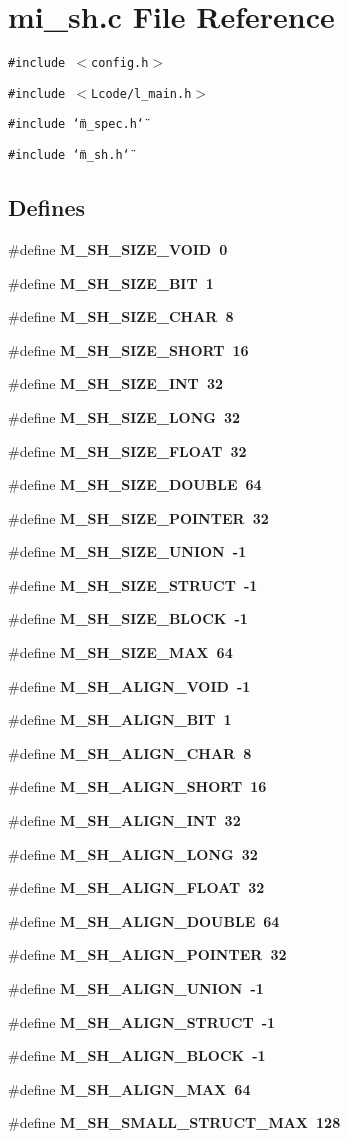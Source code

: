 \section{mi\_\-sh.c File Reference}
\label{mi__sh_8c}
{\tt \#include $<$config.h$>$}\par
{\tt \#include $<$Lcode/l\_\-main.h$>$}\par
{\tt \#include \char`\"{}m\_\-spec.h\char`\"{}}\par
{\tt \#include \char`\"{}m\_\-sh.h\char`\"{}}\par
\subsection*{Defines}
\begin{CompactItemize}
\item 
\#define \bf{M\_\-SH\_\-SIZE\_\-VOID}~0
\item 
\#define \bf{M\_\-SH\_\-SIZE\_\-BIT}~1
\item 
\#define \bf{M\_\-SH\_\-SIZE\_\-CHAR}~8
\item 
\#define \bf{M\_\-SH\_\-SIZE\_\-SHORT}~16
\item 
\#define \bf{M\_\-SH\_\-SIZE\_\-INT}~32
\item 
\#define \bf{M\_\-SH\_\-SIZE\_\-LONG}~32
\item 
\#define \bf{M\_\-SH\_\-SIZE\_\-FLOAT}~32
\item 
\#define \bf{M\_\-SH\_\-SIZE\_\-DOUBLE}~64
\item 
\#define \bf{M\_\-SH\_\-SIZE\_\-POINTER}~32
\item 
\#define \bf{M\_\-SH\_\-SIZE\_\-UNION}~-1
\item 
\#define \bf{M\_\-SH\_\-SIZE\_\-STRUCT}~-1
\item 
\#define \bf{M\_\-SH\_\-SIZE\_\-BLOCK}~-1
\item 
\#define \bf{M\_\-SH\_\-SIZE\_\-MAX}~64
\item 
\#define \bf{M\_\-SH\_\-ALIGN\_\-VOID}~-1
\item 
\#define \bf{M\_\-SH\_\-ALIGN\_\-BIT}~1
\item 
\#define \bf{M\_\-SH\_\-ALIGN\_\-CHAR}~8
\item 
\#define \bf{M\_\-SH\_\-ALIGN\_\-SHORT}~16
\item 
\#define \bf{M\_\-SH\_\-ALIGN\_\-INT}~32
\item 
\#define \bf{M\_\-SH\_\-ALIGN\_\-LONG}~32
\item 
\#define \bf{M\_\-SH\_\-ALIGN\_\-FLOAT}~32
\item 
\#define \bf{M\_\-SH\_\-ALIGN\_\-DOUBLE}~64
\item 
\#define \bf{M\_\-SH\_\-ALIGN\_\-POINTER}~32
\item 
\#define \bf{M\_\-SH\_\-ALIGN\_\-UNION}~-1
\item 
\#define \bf{M\_\-SH\_\-ALIGN\_\-STRUCT}~-1
\item 
\#define \bf{M\_\-SH\_\-ALIGN\_\-BLOCK}~-1
\item 
\#define \bf{M\_\-SH\_\-ALIGN\_\-MAX}~64
\item 
\#define \bf{M\_\-SH\_\-SMALL\_\-STRUCT\_\-MAX}~128
\end{CompactItemize}
